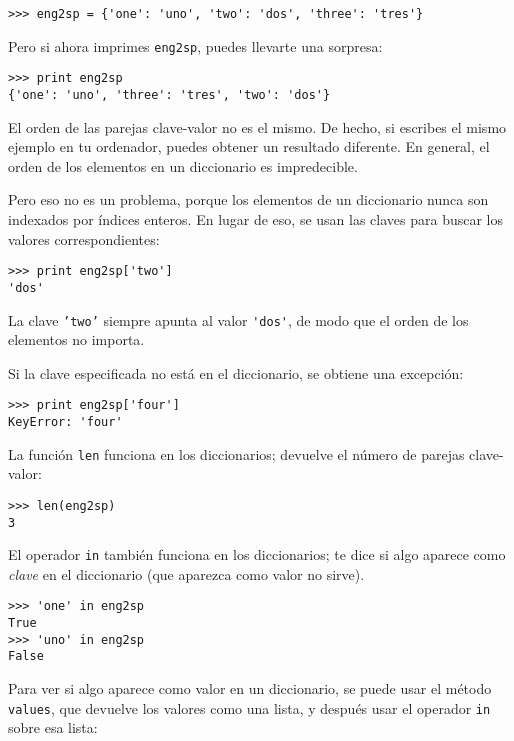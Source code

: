 \beforeverb
\begin{verbatim}
>>> eng2sp = {'one': 'uno', 'two': 'dos', 'three': 'tres'}
\end{verbatim}
\afterverb
%
Pero si ahora imprimes {\tt eng2sp}, puedes llevarte una sorpresa:

\beforeverb
\begin{verbatim}
>>> print eng2sp
{'one': 'uno', 'three': 'tres', 'two': 'dos'}
\end{verbatim}
\afterverb
%
El orden de las parejas clave-valor no es el mismo. De hecho, si
escribes el mismo ejemplo en tu ordenador, puedes obtener un
resultado diferente. En general, el orden de los elementos en
un diccionario es impredecible.

Pero eso no es un problema, porque
los elementos de un diccionario nunca son indexados por índices enteros.
En lugar de eso, se usan las claves para buscar los valores correspondientes:

\beforeverb
\begin{verbatim}
>>> print eng2sp['two']
'dos'
\end{verbatim}
\afterverb
%
La clave {\tt 'two'} siempre apunta al valor \verb"'dos'", de modo que el orden
de los elementos no importa.

Si la clave especificada no está en el diccionario, se obtiene una excepción:


\beforeverb
\begin{verbatim}
>>> print eng2sp['four']
KeyError: 'four'
\end{verbatim}
\afterverb
%
La función {\tt len} funciona en los diccionarios; devuelve el
número de parejas clave-valor:


\beforeverb
\begin{verbatim}
>>> len(eng2sp)
3
\end{verbatim}
\afterverb
%
El operador {\tt in} también funciona en los diccionarios; te dice si
algo aparece como \emph{clave} en el diccionario (que aparezca
como valor no sirve).


\beforeverb
\begin{verbatim}
>>> 'one' in eng2sp
True
>>> 'uno' in eng2sp
False
\end{verbatim}
\afterverb
%
Para ver si algo aparece como valor en un diccionario, se
puede usar el método {\tt values}, que devuelve los valores como
una lista, y después usar el operador {\tt in} sobre esa lista:

